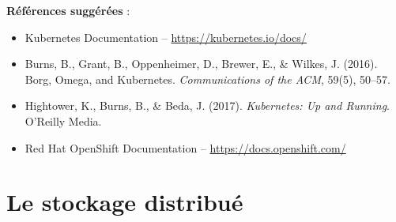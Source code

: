 \textbf{Références suggérées} :
\begin{itemize}
	\item Kubernetes Documentation – \url{https://kubernetes.io/docs/}
	\item Burns, B., Grant, B., Oppenheimer, D., Brewer, E., \& Wilkes, J. (2016). Borg, Omega, and Kubernetes. \textit{Communications of the ACM}, 59(5), 50–57.
	\item Hightower, K., Burns, B., \& Beda, J. (2017). \textit{Kubernetes: Up and Running}. O’Reilly Media.
	\item Red Hat OpenShift Documentation – \url{https://docs.openshift.com/}
\end{itemize}

\section{Le stockage distribué}

